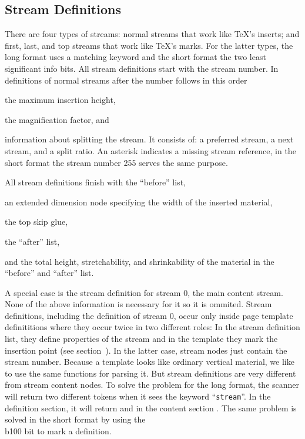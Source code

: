 \subsection{Stream Definitions}
There are four types of streams:  normal streams that work like \TeX's inserts;
and first, last, and top streams that work like \TeX's marks.
For the latter  types, the long format uses a matching keyword and the
short format the two least significant info bits. All stream definitions
start with the stream number.
In definitions of  normal streams after the number follows in this order
\itemize
\item the maximum insertion height,
\item the magnification factor, and
\item information about splitting the stream.
It consists of: a preferred stream, a next stream, and a split ratio.
An asterisk indicates a missing stream reference, in the
short format the stream number 255 serves the same purpose.
\item All stream definitions finish with the ``before'' list,
\item an extended dimension node specifying the width of the inserted material,
\item the top skip glue,
\item  the ``after'' list,
\item and the total height, stretchability, and shrinkability of the material in
the ``before'' and ``after'' list.
\enditemize

A special case is the stream definition for stream 0, the main content stream.
None of the above information is necessary for it so it is ommited.
Stream definitions, including the definition of stream 0,
occur only inside page template definititions
where they occur twice in two different roles:
In the stream definition list, they define properties of the stream
and in the template they mark the insertion point (see section~).
In the latter case, stream nodes just contain the stream number.
Because a template looks like ordinary vertical material,
we like to use the same functions for parsing it.
But stream definitions are very different from stream content
nodes. To solve the problem for the long format,
the scanner will return two different tokens
when it sees the keyword ``{\tt stream}''.
In the definition section, it will return
 and in the content section .
The same problem is solved in the short format
by using the \\{b100} bit to mark a definition.


